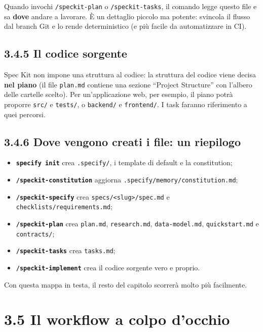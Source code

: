 \documentclass[
  italian,
  10pt,
]{book}
\providecommand{\tightlist}{%
  \setlength{\itemsep}{0pt}\setlength{\parskip}{0pt}}
\begin{document}
Quando invochi \texttt{/speckit-plan} o \texttt{/speckit-tasks}, il
comando legge questo file e sa \textbf{dove} andare a lavorare. È un
dettaglio piccolo ma potente: svincola il flusso dal branch Git e lo
rende deterministico (e più facile da automatizzare in CI).

\subsection{3.4.5 Il codice sorgente}\label{il-codice-sorgente}

Spec Kit non impone una struttura al codice: la struttura del codice
viene decisa \textbf{nel piano} (il file \texttt{plan.md} contiene una
sezione ``Project Structure'' con l'albero delle cartelle scelto). Per
un'applicazione web, per esempio, il piano potrà proporre \texttt{src/}
e \texttt{tests/}, o \texttt{backend/} e \texttt{frontend/}. I task
faranno riferimento a quei percorsi.

\subsection{3.4.6 Dove vengono creati i file: un
riepilogo}\label{dove-vengono-creati-i-file-un-riepilogo}

\begin{itemize}
\tightlist
\item
  \textbf{\texttt{specify\ init}} crea \texttt{.specify/}, i template di
  default e la constitution;
\item
  \textbf{\texttt{/speckit-constitution}} aggiorna
  \texttt{.specify/memory/constitution.md};
\item
  \textbf{\texttt{/speckit-specify}} crea
  \texttt{specs/\textless{}slug\textgreater{}/spec.md} e
  \texttt{checklists/requirements.md};
\item
  \textbf{\texttt{/speckit-plan}} crea \texttt{plan.md},
  \texttt{research.md}, \texttt{data-model.md}, \texttt{quickstart.md} e
  \texttt{contracts/};
\item
  \textbf{\texttt{/speckit-tasks}} crea \texttt{tasks.md};
\item
  \textbf{\texttt{/speckit-implement}} crea il codice sorgente vero e
  proprio.
\end{itemize}

Con questa mappa in testa, il resto del capitolo scorrerà molto più
facilmente.

\section{3.5 Il workflow a colpo
d'occhio}\label{il-workflow-a-colpo-docchio}
\end{document}
